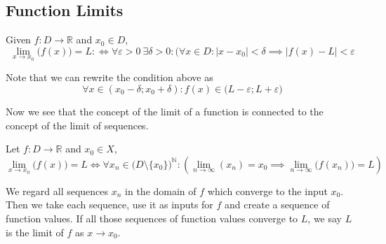\subsection{Function Limits}\label{ssec:function_limits}
\begin{definition}\label{def:func_limit}
   Given \(f: D \to \mathbb{R}\) and \(x_0 \in D\),
   \[\lim_{x \to x_0}\big(f(x)\big) = L :\iff \forall \varepsilon > 0~\exists \delta > 0: (\forall x \in D: \lvert x - x_0 \rvert < \delta \implies \lvert f(x) - L\rvert < \varepsilon\]
\end{definition}
\begin{remark}[Intuition]
   Note that we can rewrite the condition above as
   \[\forall x \in (x_0 - \delta; x_0 + \delta): f(x) \in \big(L - \varepsilon; L + \varepsilon\big)\]
   \begin{center}
      
   \end{center}
\end{remark}
Now we see that the concept of the limit of a function is connected to the concept of the limit of sequences.
\begin{proposition}[Function Limit = Sequence Limit]
   Let \(f: D \to \mathbb{R}\) and \(x_0 \in X\),
   \[\lim_{x \to x_0}\big(f(x)\big) = L \iff \forall x_n \in \big(D\setminus\{x_0\}\big)^\mathbb{N}: \left(\lim_{n \to \infty}(x_n) = x_0 \implies  \lim_{n \to \infty}\big(f(x_n)\big) = L\right)\]
\end{proposition}
\begin{remark}[Intuition]
   We regard all sequences \(x_n\) in the domain of \(f\) which converge to the input \(x_0\).
   Then we take each sequence, use it as inputs for \(f\) and create a sequence of function values.
   If all those sequences of function values converge to \(L\), we say \(L\) is the limit of \(f\) as \(x \to x_0\).
\end{remark}


